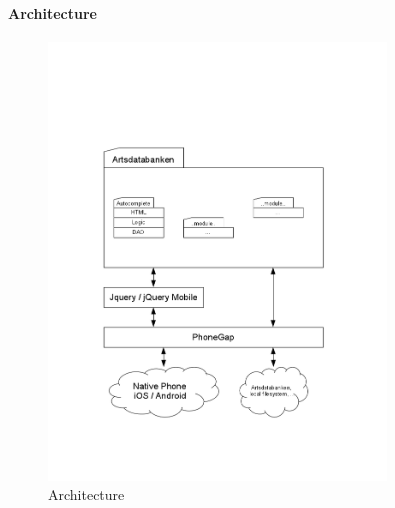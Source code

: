 \paragraph{Architecture}

\begin{figure}[h!]
	\centering
	\includegraphics[trim=5cm 4cm 5cm 11cm, width=0.8\textwidth]{implementation/architecture/architecture.png}
	\caption{Architecture}
	\label{fig:architecture}
\end{figure}
\newpage